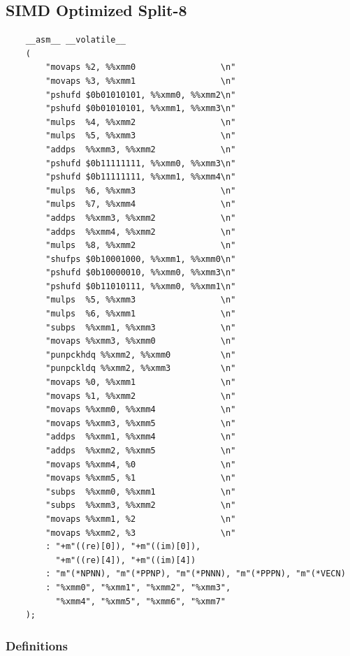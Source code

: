 \documentclass[a4paper]{report}
\begin{document}
\subsection{SIMD Optimized Split-8} \indent

    \lstset{language = c, tabsize = 4}
    \begin{lstlisting}
    __asm__ __volatile__
    (
        "movaps %2, %%xmm0                 \n"
        "movaps %3, %%xmm1                 \n"
        "pshufd $0b01010101, %%xmm0, %%xmm2\n"
        "pshufd $0b01010101, %%xmm1, %%xmm3\n"
        "mulps  %4, %%xmm2                 \n"
        "mulps  %5, %%xmm3                 \n"
        "addps  %%xmm3, %%xmm2             \n"
        "pshufd $0b11111111, %%xmm0, %%xmm3\n"
        "pshufd $0b11111111, %%xmm1, %%xmm4\n"
        "mulps  %6, %%xmm3                 \n"
        "mulps  %7, %%xmm4                 \n"
        "addps  %%xmm3, %%xmm2             \n"
        "addps  %%xmm4, %%xmm2             \n"
        "mulps  %8, %%xmm2                 \n"
        "shufps $0b10001000, %%xmm1, %%xmm0\n"
        "pshufd $0b10000010, %%xmm0, %%xmm3\n"
        "pshufd $0b11010111, %%xmm0, %%xmm1\n"
        "mulps  %5, %%xmm3                 \n"
        "mulps  %6, %%xmm1                 \n"
        "subps  %%xmm1, %%xmm3             \n"
        "movaps %%xmm3, %%xmm0             \n"
        "punpckhdq %%xmm2, %%xmm0          \n"
        "punpckldq %%xmm2, %%xmm3          \n"
        "movaps %0, %%xmm1                 \n"
        "movaps %1, %%xmm2                 \n"
        "movaps %%xmm0, %%xmm4             \n"
        "movaps %%xmm3, %%xmm5             \n"
        "addps  %%xmm1, %%xmm4             \n"
        "addps  %%xmm2, %%xmm5             \n"
        "movaps %%xmm4, %0                 \n"
        "movaps %%xmm5, %1                 \n"
        "subps  %%xmm0, %%xmm1             \n"
        "subps  %%xmm3, %%xmm2             \n"
        "movaps %%xmm1, %2                 \n"
        "movaps %%xmm2, %3                 \n"
        : "+m"((re)[0]), "+m"((im)[0]),
          "+m"((re)[4]), "+m"((im)[4])
        : "m"(*NPNN), "m"(*PPNP), "m"(*PNNN), "m"(*PPPN), "m"(*VECN)
        : "%xmm0", "%xmm1", "%xmm2", "%xmm3",
          "%xmm4", "%xmm5", "%xmm6", "%xmm7" 
    );
    \end{lstlisting}

\subsubsection{Definitions} \indent
\end{document}
